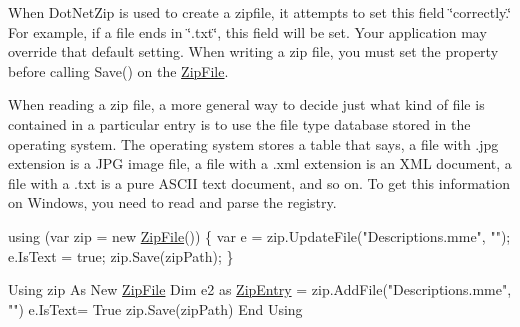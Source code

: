 When Dot\+Net\+Zip is used to create a zipfile, it attempts to set this field \char`\"{}correctly.\char`\"{} For example, if a file ends in \char`\"{}.\+txt\char`\"{}, this field will be set. Your application may override that default setting. When writing a zip file, you must set the property before calling {\ttfamily Save()} on the \mbox{\hyperlink{class_super_tiled2_unity_1_1_ionic_1_1_zip_1_1_zip_file}{Zip\+File}}. 

When reading a zip file, a more general way to decide just what kind of file is contained in a particular entry is to use the file type database stored in the operating system. The operating system stores a table that says, a file with .jpg extension is a J\+PG image file, a file with a .xml extension is an X\+ML document, a file with a .txt is a pure A\+S\+C\+II text document, and so on. To get this information on Windows,  you need to read and parse the registry.


\begin{DoxyCode}
\textcolor{keyword}{using} (var zip = \textcolor{keyword}{new} \mbox{\hyperlink{namespace_super_tiled2_unity_1_1_ionic_1_1_zip_a9ced5352c56e7e0fceff15b534073c83a088ad16b06174c69965e232063ba6d16}{ZipFile}}())
\{
    var e = zip.UpdateFile(\textcolor{stringliteral}{"Descriptions.mme"}, \textcolor{stringliteral}{""});
    e.IsText = \textcolor{keyword}{true};
    zip.Save(zipPath);
\}
\end{DoxyCode}



\begin{DoxyCode}
Using zip As New \mbox{\hyperlink{namespace_super_tiled2_unity_1_1_ionic_1_1_zip_a9ced5352c56e7e0fceff15b534073c83a088ad16b06174c69965e232063ba6d16}{ZipFile}}
    Dim e2 as \mbox{\hyperlink{class_super_tiled2_unity_1_1_ionic_1_1_zip_1_1_zip_entry_a440b6d4d136b20dc6bdbdd399397e3a0}{ZipEntry}} = zip.AddFile(\textcolor{stringliteral}{"Descriptions.mme"}, \textcolor{stringliteral}{""})
    e.IsText= True
    zip.Save(zipPath)
End Using
\end{DoxyCode}
 \mbox{\label{class_super_tiled2_unity_1_1_ionic_1_1_zip_1_1_zip_entry_acd1234fd27c216b59c166c2b96aba3dd}} 
